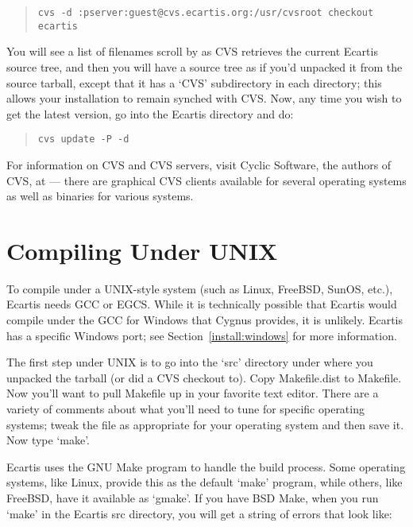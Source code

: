 \documentclass{book}
\begin{document}
\begin{quote}
\footnotesize
\begin{verbatim}
cvs -d :pserver:guest@cvs.ecartis.org:/usr/cvsroot checkout ecartis
\end{verbatim}
\end{quote}
   
You will see a list of filenames scroll by as CVS retrieves the current Ecartis
source tree, and then you will have a source tree as if you'd unpacked it from
the source tarball, except that it has a `CVS' subdirectory in each directory;
this allows your installation to remain synched with CVS.  Now, any time you
wish to get the latest version, go into the Ecartis directory and do:
   
\begin{quote}
\footnotesize
\begin{verbatim}
cvs update -P -d
\end{verbatim}
\end{quote}

For information on CVS and CVS servers, visit Cyclic Software, the authors of
CVS, at  --- there are graphical CVS clients
available for several operating systems as well as binaries for various
systems.
   
\section{Compiling Under UNIX}
\label{install:unix}

To compile under a UNIX-style system (such as Linux, FreeBSD, SunOS, etc.),
Ecartis needs GCC or EGCS.  While it is technically possible that Ecartis would
compile under the GCC for Windows that Cygnus provides, it is unlikely.
Ecartis has a specific Windows port; see Section~\ref{install:windows} for more
information.

The first step under UNIX is to go into the `src' directory under where you
unpacked the tarball (or did a CVS checkout to).  Copy Makefile.dist to
Makefile.  Now you'll want to pull Makefile up in your favorite text editor.
There are a variety of comments about what you'll need to tune for specific
operating systems; tweak the file as appropriate for your operating system and
then save it.  Now type `make'.
   
Ecartis uses the GNU Make program to handle the build process.  Some operating
systems, like Linux, provide this as the default `make' program, while others,
like FreeBSD, have it available as `gmake'.  If you have BSD Make, when you
run `make' in the Ecartis src directory, you will get a string of errors that
look like:
\end{document}
